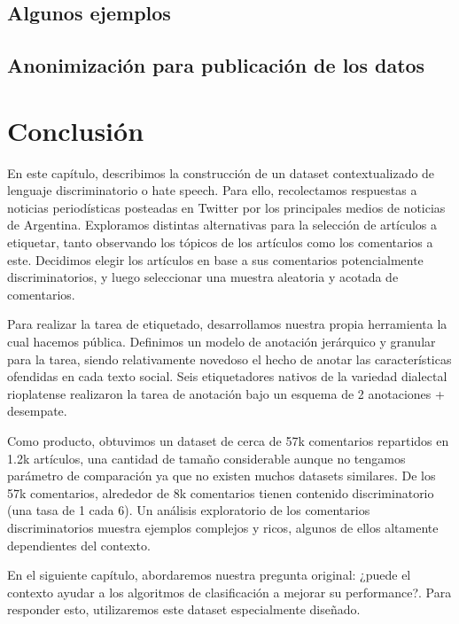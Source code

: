 \subsection{Algunos ejemplos}






\subsection{Anonimización para publicación de los datos}



\section{Conclusión}

En este capítulo, describimos la construcción de un dataset contextualizado de lenguaje discriminatorio o hate speech. Para ello, recolectamos respuestas a noticias periodísticas posteadas en Twitter por los principales medios de noticias de Argentina. Exploramos distintas alternativas para la selección de artículos a etiquetar, tanto observando los tópicos de los artículos como los comentarios a este. Decidimos elegir los artículos en base a sus comentarios potencialmente discriminatorios, y luego seleccionar una muestra aleatoria y acotada de comentarios.

Para realizar la tarea de etiquetado, desarrollamos nuestra propia herramienta la cual hacemos pública. Definimos un modelo de anotación jerárquico y granular para la tarea, siendo relativamente novedoso el hecho de anotar las características ofendidas en cada texto social. Seis etiquetadores nativos de la variedad dialectal rioplatense realizaron la tarea de anotación bajo un esquema de 2 anotaciones + desempate.

Como producto, obtuvimos un dataset de cerca de 57k comentarios repartidos en 1.2k artículos, una cantidad de tamaño considerable aunque no tengamos parámetro de comparación ya que no existen muchos datasets similares. De los 57k comentarios, alrededor de 8k comentarios tienen contenido discriminatorio (una tasa de 1 cada 6). Un análisis exploratorio de los comentarios discriminatorios muestra ejemplos complejos y ricos, algunos de ellos altamente dependientes del contexto.

En el siguiente capítulo, abordaremos nuestra pregunta original: ¿puede el contexto ayudar a los algoritmos de clasificación a mejorar su performance?. Para responder esto, utilizaremos este dataset especialmente diseñado.
